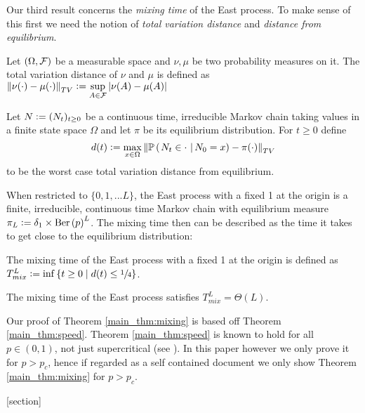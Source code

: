 Our third result concerns the \textit{mixing time} of the East process. To make sense of this first we need the notion of \textit{total variation distance} and \textit{distance from equilibrium}. 
\begin{definition}
Let $(\Omega, \cal{F})$ be a measurable space and $\nu, \mu$ be two probability measures on it. The total variation distance of $\nu$ and $\mu$ is defined as $\left\Vert \nu(\cdot) - \mu(\cdot) \right\Vert_{TV} \defeq \sup\limits_{A \in \cal{F}} \left| \nu(A) - \mu(A) \right|$
\end{definition}
\begin{definition}\label{def:eq_distance}
Let $N \defeq (N_t)_{t \geq 0}$ be a continuous time, irreducible Markov chain taking values in a finite state space $\Omega$ and let $\pi$ be its equilibrium distribution. For $t \geq 0$ define 
\begin{equation}\nonumber
d(t) \defeq \max\limits_{x \in \Omega} \left\Vert \PrCond{N_t \in \cdot\ }{N_0 = x} - \pi(\cdot) \right\Vert_{TV} 
\end{equation}
to be the worst case total variation distance from equilibrium. 
\end{definition}

When restricted to $\{0, 1, ... L\}$, the East process with a fixed 1 at the origin is a finite, irreducible, continuous time Markov chain with equilibrium measure $\pi_L \defeq \delta_{1} \times \dBer{p}^L$. The mixing time then can be described as the time it takes to get close to the equilibrium distribution:
\begin{definition}
The mixing time of the East process with a fixed 1 at the origin is defined as $T^L_{mix} \defeq \inf\left\{ t \geq 0 \mid d(t) \leq \sfrac{1}{4} \right\}$. 
\end{definition}

\begin{theorem}\label{main_thm:mixing}
The mixing time of the East process satisfies $T^L_{mix} = \Theta(L)$. 
\end{theorem}

\begin{remark}
Our proof of Theorem \ref{main_thm:mixing} is based off Theorem \ref{main_thm:speed}. Theorem \ref{main_thm:speed} is known to hold for all $p \in (0,1)$, not just supercritical (see \cite[Theorem 6.1]{cancrini2008kinetically}). In this paper however we only prove it for $p > p_c$, hence if regarded as a self contained document we only show Theorem \ref{main_thm:mixing} for $p > p_c$. 
\end{remark}

[section]
